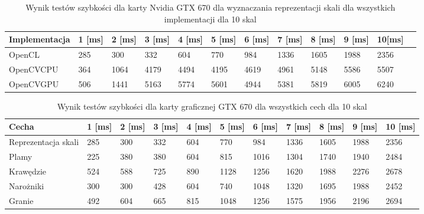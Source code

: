\begin{table}[h]
\caption{Wynik testów szybkości dla karty Nvidia GTX 670 dla wyznaczania reprezentacji skali dla wszystkich implementacji dla 10 skal}
\label{tab:allGTX}

\begin{tabular}{|l|l|l|l|l|l|l|l|l|l|l|l|}
\hline
Implementacja & 1 [ms] & 2 [ms] & 3 [ms] & 4  [ms]  & 5 [ms]   & 6 [ms]   & 7  [ms]  & 8 [ms]   & 9 [ms]    & 10[ms]    \\ \hline
OpenCL               & 285        & 300               & 332      & 604  & 770  & 984  & 1336 & 1605 & 1988  & 2356  \\ \hline
OpenCVCPU            & 364        & 1064              & 4179     & 4494 & 4195 & 4619 & 4961 & 5148 & 5586  & 5507  \\ \hline
OpenCVGPU            & 506        & 1441              & 5163     & 5774 & 5601 & 4944 & 5381 & 5819 & 6005  & 6240  \\ \hline
\end{tabular}
\end{table}
\begin{table}[h]
\caption{Wynik testów szybkości dla karty graficznej GTX 670 dla wszystkich cech dla 10 skal}
\label{tab:allV}

\begin{tabular}{|p{2cm}|l|l|l|l|l|l|l|l|l|l|}
\hline
Cecha               & 1  [ms] & 2  [ms] & 3  [ms] & 4  [ms] & 5    [ms]& 6    [ms]& 7    [ms]& 8    [ms]& 9    [ms]& 10   [ms]\\ \hline
Reprezentacja skali & 285 & 300 & 332 & 604 & 770  & 984  & 1336 & 1605 & 1988 & 2356 \\ \hline
Plamy               & 225 & 380 & 380 & 604 & 815  & 1016 & 1304 & 1740 & 1940 & 2484 \\ \hline
Krawędzie           & 524 & 588 & 725 & 890 & 1128 & 1256 & 1620 & 1988 & 2276 & 2678 \\ \hline
Narożniki           & 300 & 300 & 428 & 604 & 740  & 1048 & 1320 & 1695 & 1988 & 2452 \\ \hline
Granie              & 492 & 604 & 665 & 815 & 1048 & 1256 & 1575 & 1956 & 2196 & 2694 \\ \hline
\end{tabular}
\end{table}